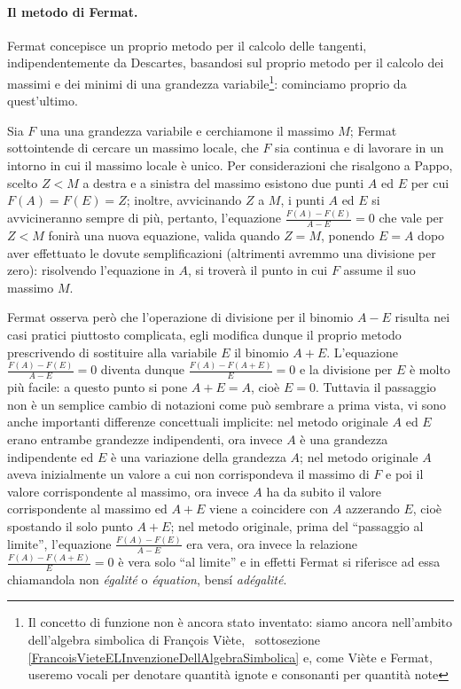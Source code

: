 \paragraph{Il metodo di Fermat.} Fermat concepisce un proprio metodo per il calcolo delle tangenti, indipendentemente da Descartes, basandosi sul proprio metodo per il calcolo dei massimi e dei minimi di una grandezza variabile\footnote{Il concetto di funzione non \`e ancora stato inventato: siamo ancora nell'ambito dell'algebra simbolica di Fran\c{c}ois Vi\`ete, \Cfr\ sottosezione \ref{FrancoisVieteELInvenzioneDellAlgebraSimbolica} e, come Vi\`ete e Fermat, useremo vocali per denotare quantit\`a ignote e consonanti per quantit\`a note}: cominciamo proprio da quest'ultimo.
\par Sia $F$ una una grandezza variabile e cerchiamone il massimo $M$; Fermat sottointende di cercare un massimo locale, che $F$ sia continua e di lavorare in un intorno in cui il massimo locale \`e unico. Per considerazioni che risalgono a Pappo, scelto $Z < M$ a destra e a sinistra del massimo esistono due punti $A$ ed $E$ per cui $F(A) = F(E) = Z$; inoltre, avvicinando $Z$ a $M$, i punti $A$ ed $E$ si avvicineranno sempre di pi\`u, pertanto, l'equazione $\frac{F(A) - F(E)}{A - E} = 0$ che vale per $Z < M$ fonir\`a una nuova equazione, valida quando $Z = M$, ponendo $E = A$ dopo aver effettuato le dovute semplificazioni (altrimenti avremmo una divisione per zero): risolvendo l'equazione in $A$, si trover\`a il punto in cui $F$ assume il suo massimo $M$.
\par Fermat osserva per\`o che l'operazione di divisione per il binomio $A - E$ risulta nei casi pratici piuttosto complicata, egli modifica dunque il proprio metodo prescrivendo di sostituire alla variabile $E$ il binomio $A + E$. L'equazione $\frac{F(A) - F(E)}{A - E} = 0$ diventa dunque $\frac{F(A) - F(A + E)}{E} = 0$ e la divisione per $E$ \`e molto pi\`u facile: a questo punto si pone $A + E = A$, cio\`e $E = 0$. Tuttavia il passaggio non \`e un semplice cambio di notazioni come pu\`o sembrare a prima vista, vi sono anche importanti differenze concettuali implicite: nel metodo originale $A$ ed $E$ erano entrambe grandezze indipendenti, ora invece $A$ \`e una grandezza indipendente ed $E$ \`e una variazione della grandezza $A$; nel metodo originale $A$ aveva inizialmente un valore a cui non corrispondeva il massimo di $F$ e poi il valore corrispondente al massimo, ora invece $A$ ha da subito il valore corrispondente al massimo ed $A + E$ viene a coincidere con $A$ azzerando $E$, cio\`e spostando il solo punto $A + E$; nel metodo originale, prima del ``passaggio al limite'', l'equazione $\frac{F(A) - F(E)}{A - E}$ era vera, ora invece la relazione $\frac{F(A) - F(A + E)}{E} = 0$ \`e vera solo ``al limite'' e in effetti Fermat si riferisce ad essa chiamandola non \textit{\'egalit\'e} o \textit{\'equation}, bens\'i \textit{ad\'egalit\'e}.
